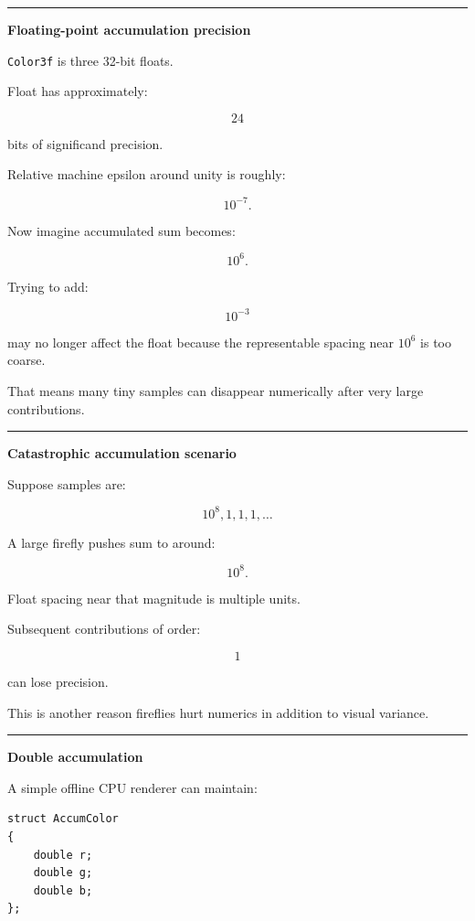 \begin{center}\rule{0.5\linewidth}{0.5pt}\end{center}

\textbf{Floating-point accumulation precision}

\texttt{Color3f} is three 32-bit floats.

Float has approximately:

\[
24
\]

bits of significand precision.

Relative machine epsilon around unity is roughly:

\[
10^{-7}.
\]

Now imagine accumulated sum becomes:

\[
10^6.
\]

Trying to add:

\[
10^{-3}
\]

may no longer affect the float because the representable spacing near \(10^6\) is too coarse.

That means many tiny samples can disappear numerically after very large contributions.

\begin{center}\rule{0.5\linewidth}{0.5pt}\end{center}

\textbf{Catastrophic accumulation scenario}

Suppose samples are:

\[
10^8,
1,
1,
1,
\dots
\]

A large firefly pushes sum to around:

\[
10^8.
\]

Float spacing near that magnitude is multiple units.

Subsequent contributions of order:

\[
1
\]

can lose precision.

This is another reason fireflies hurt numerics in addition to visual variance.

\begin{center}\rule{0.5\linewidth}{0.5pt}\end{center}

\textbf{Double accumulation}

A simple offline CPU renderer can maintain:

\begin{verbatim}
struct AccumColor
{
    double r;
    double g;
    double b;
};
\end{verbatim}

